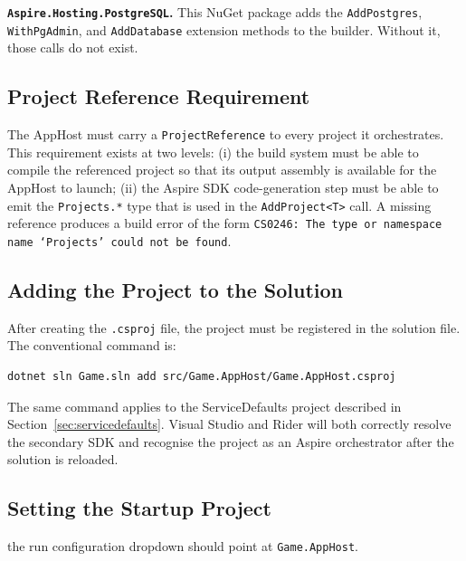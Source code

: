 \textbf{\texttt{Aspire.Hosting.PostgreSQL}.} This NuGet package adds the \texttt{AddPostgres}, \texttt{WithPgAdmin}, and \texttt{AddDatabase} extension methods to the builder. Without it, those calls do not exist.

\subsection{Project Reference Requirement}

The AppHost must carry a \texttt{ProjectReference} to every project it orchestrates. This requirement exists at two levels: (i) the build system must be able to compile the referenced project so that its output assembly is available for the AppHost to launch; (ii) the Aspire SDK code-generation step must be able to emit the \texttt{Projects.*} type that is used in the \texttt{AddProject\textless T\textgreater} call. A missing reference produces a build error of the form \texttt{CS0246: The type or namespace name `Projects' could not be found}.

\subsection{Adding the Project to the Solution}

After creating the \texttt{.csproj} file, the project must be registered in the solution file. The conventional command is:

\begin{lstlisting}
dotnet sln Game.sln add src/Game.AppHost/Game.AppHost.csproj
\end{lstlisting}

The same command applies to the ServiceDefaults project described in Section~\ref{sec:servicedefaults}. Visual Studio and Rider will both correctly resolve the secondary SDK and recognise the project as an Aspire orchestrator after the solution is reloaded.

\subsection{Setting the Startup Project}

the run configuration dropdown should point at \texttt{Game.AppHost}.
